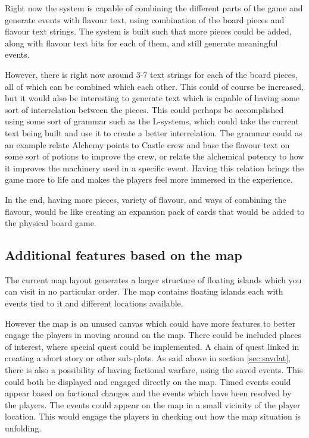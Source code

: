 Right now the system is capable of combining the different parts of the game and generate events with flavour text, using combination of the board pieces and flavour text strings.
The system is built such that more pieces could be added, along with flavour text bits for each of them, and still generate meaningful events. 

However, there is right now around 3-7 text strings for each of the board pieces, all of which can be combined which each other. This could of course be increased, but it would also be interesting to generate text which is capable of having some sort of interrelation between the pieces. 
This could perhaps be accomplished using some sort of grammar such as the L-systems, which could take the current text being built and use it to create a better interrelation. 
The grammar could as an example relate Alchemy points to Castle crew and base the flavour text on some sort of potions to improve the crew, or relate the alchemical potency to how it improves the machinery used in a specific event. 
Having this relation brings the game more to life and makes the players feel more immersed in the experience.

In the end, having more pieces, variety of flavour, and ways of combining the flavour, would be like creating an expansion pack of cards that would be added to the physical board game.

\subsection{Additional features based on the map}
The current map layout generates a larger structure of floating islands which you can visit in no particular order. The map contains floating islands each with events tied to it and different locations available.

However the map is an unused canvas which could have more features to better engage the players in moving around on the map. 
There could be included places of interest, where special quest could be implemented. A chain of quest linked in creating a short story or other sub-plots. 
As said above in section \ref{sec:savdat}, there is also a possibility of having factional warfare, using the saved events. This could both be displayed and engaged directly on the map. 
Timed events could appear based on factional changes and the events which have been resolved by the players. The events could appear on the map in a small vicinity of the player location. This would engage the players in checking out how the map situation is unfolding. 

